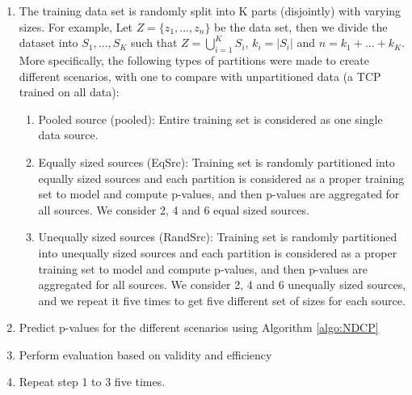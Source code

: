 \documentclass[preprint,12pt,authoryear]{elsarticle}
\begin{document}

\begin{enumerate}

\item The training data set is randomly split into K parts (disjointly) with varying sizes. For example, Let $Z = \{ z_1 , ..., z_n \} $ be the data set, then we divide the dataset into $S_1, ..., S_K$ such that $Z = \bigcup_{i=1}^K S_i$, $k_i = |S_i|$ and $n = k_1+ ...+k_K$. More specifically, the following types of partitions were made to create different scenarios, with one to compare with unpartitioned data (a TCP trained on all data):

\begin{enumerate}
	\item Pooled source (pooled): Entire training set is considered as one single data source.
	\item Equally sized sources (EqSrc): Training set is randomly partitioned into equally sized sources and  each partition is considered as a proper training set to model and compute p-values, and then p-values are aggregated for all sources. We consider 2, 4 and 6 equal sized sources. %
	\item Unequally sized sources (RandSrc): Training set is randomly partitioned into unequally sized sources and  each partition is considered as a proper training set to model and compute p-values, and then p-values are aggregated for all sources. We consider 2, 4 and 6 unequally sized sources, and we repeat it five times to get five different set of sizes for each source.

\end{enumerate}


\item Predict p-values for the different scenarios using Algorithm \ref{algo:NDCP}

\item Perform evaluation based on validity and efficiency

\item Repeat step 1 to 3  five times.


\end{enumerate}
\end{document}
